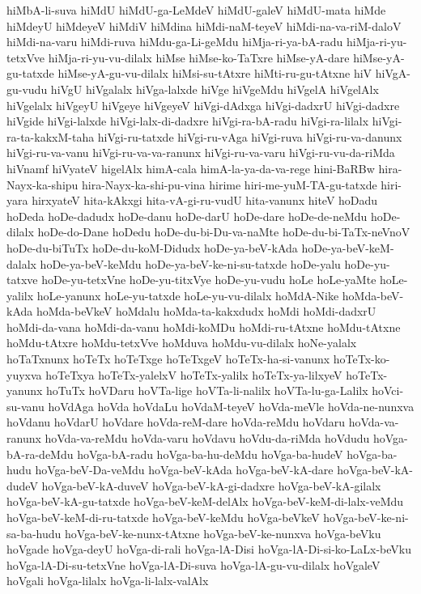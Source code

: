 {hiMbA-li-suva
hiMdU
hiMdU-ga-LeMdeV
hiMdU-galeV
hiMdU-mata
hiMde
hiMdeyU
hiMdeyeV
hiMdiV
hiMdina
hiMdi-naM-teyeV
hiMdi-na-va-riM-daloV
hiMdi-na-varu
hiMdi-ruva
hiMdu-ga-Li-geMdu
hiMja-ri-ya-bA-radu
hiMja-ri-yu-tetxVve
hiMja-ri-yu-vu-dilalx
hiMse
hiMse-ko-TaTxre
hiMse-yA-dare
hiMse-yA-gu-tatxde
hiMse-yA-gu-vu-dilalx
hiMsi-su-tAtxre
hiMti-ru-gu-tAtxne
hiV
hiVgA-gu-vudu
hiVgU
hiVgalalx
hiVga-lalxde
hiVge
hiVgeMdu
hiVgelA
hiVgelAlx
hiVgelalx
hiVgeyU
hiVgeye
hiVgeyeV
hiVgi-dAdxga
hiVgi-dadxrU
hiVgi-dadxre
hiVgide
hiVgi-lalxde
hiVgi-lalx-di-dadxre
hiVgi-ra-bA-radu
hiVgi-ra-lilalx
hiVgi-ra-ta-kakxM-taha
hiVgi-ru-tatxde
hiVgi-ru-vAga
hiVgi-ruva
hiVgi-ru-va-danunx
hiVgi-ru-va-vanu
hiVgi-ru-va-va-ranunx
hiVgi-ru-va-varu
hiVgi-ru-vu-da-riMda
hiVnamf
hiVyateV
higelAlx
himA-cala
himA-la-ya-da-va-rege
hini-BaRBw
hira-Nayx-ka-shipu
hira-Nayx-ka-shi-pu-vina
hirime
hiri-me-yuM-TA-gu-tatxde
hiri-yara
hirxyateV
hita-kAkxgi
hita-vA-gi-ru-vudU
hita-vanunx
hiteV
hoDadu
hoDeda
hoDe-dadudx
hoDe-danu
hoDe-darU
hoDe-dare
hoDe-de-neMdu
hoDe-dilalx
hoDe-do-Dane
hoDedu
hoDe-du-bi-Du-va-naMte
hoDe-du-bi-TaTx-neVnoV
hoDe-du-biTuTx
hoDe-du-koM-Didudx
hoDe-ya-beV-kAda
hoDe-ya-beV-keM-dalalx
hoDe-ya-beV-keMdu
hoDe-ya-beV-ke-ni-su-tatxde
hoDe-yalu
hoDe-yu-tatxve
hoDe-yu-tetxVne
hoDe-yu-titxVye
hoDe-yu-vudu
hoLe
hoLe-yaMte
hoLe-yalilx
hoLe-yanunx
hoLe-yu-tatxde
hoLe-yu-vu-dilalx
hoMdA-Nike
hoMda-beV-kAda
hoMda-beVkeV
hoMdalu
hoMda-ta-kakxdudx
hoMdi
hoMdi-dadxrU
hoMdi-da-vana
hoMdi-da-vanu
hoMdi-koMDu
hoMdi-ru-tAtxne
hoMdu-tAtxne
hoMdu-tAtxre
hoMdu-tetxVve
hoMduva
hoMdu-vu-dilalx
hoNe-yalalx
hoTaTxnunx
hoTeTx
hoTeTxge
hoTeTxgeV
hoTeTx-ha-si-vanunx
hoTeTx-ko-yuyxva
hoTeTxya
hoTeTx-yalelxV
hoTeTx-yalilx
hoTeTx-ya-lilxyeV
hoTeTx-yanunx
hoTuTx
hoVDaru
hoVTa-lige
hoVTa-li-nalilx
hoVTa-lu-ga-Lalilx
hoVci-su-vanu
hoVdAga
hoVda
hoVdaLu
hoVdaM-teyeV
hoVda-meVle
hoVda-ne-nunxva
hoVdanu
hoVdarU
hoVdare
hoVda-reM-dare
hoVda-reMdu
hoVdaru
hoVda-va-ranunx
hoVda-va-reMdu
hoVda-varu
hoVdavu
hoVdu-da-riMda
hoVdudu
hoVga-bA-ra-deMdu
hoVga-bA-radu
hoVga-ba-hu-deMdu
hoVga-ba-hudeV
hoVga-ba-hudu
hoVga-beV-Da-veMdu
hoVga-beV-kAda
hoVga-beV-kA-dare
hoVga-beV-kA-dudeV
hoVga-beV-kA-duveV
hoVga-beV-kA-gi-dadxre
hoVga-beV-kA-gilalx
hoVga-beV-kA-gu-tatxde
hoVga-beV-keM-delAlx
hoVga-beV-keM-di-lalx-veMdu
hoVga-beV-keM-di-ru-tatxde
hoVga-beV-keMdu
hoVga-beVkeV
hoVga-beV-ke-ni-sa-ba-hudu
hoVga-beV-ke-nunx-tAtxne
hoVga-beV-ke-nunxva
hoVga-beVku
hoVgade
hoVga-deyU
hoVga-di-rali
hoVga-lA-Disi
hoVga-lA-Di-si-ko-LaLx-beVku
hoVga-lA-Di-su-tetxVne
hoVga-lA-Di-suva
hoVga-lA-gu-vu-dilalx
hoVgaleV
hoVgali
hoVga-lilalx
hoVga-li-lalx-valAlx
}
